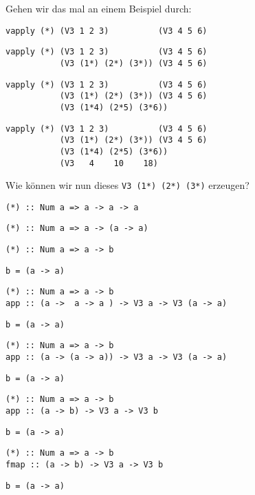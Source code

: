 \documentclass{beamer}
\begin{document}
\begin{frame}[fragile]
Gehen wir das mal an einem Beispiel durch:
\begin{overprint}
\begin{verbatim}
vapply (*) (V3 1 2 3)          (V3 4 5 6)
\end{verbatim}
\begin{verbatim}
vapply (*) (V3 1 2 3)          (V3 4 5 6)
           (V3 (1*) (2*) (3*)) (V3 4 5 6)
\end{verbatim}
\begin{verbatim}
vapply (*) (V3 1 2 3)          (V3 4 5 6)
           (V3 (1*) (2*) (3*)) (V3 4 5 6)
           (V3 (1*4) (2*5) (3*6))
\end{verbatim}
\begin{verbatim}
vapply (*) (V3 1 2 3)          (V3 4 5 6)
           (V3 (1*) (2*) (3*)) (V3 4 5 6)
           (V3 (1*4) (2*5) (3*6))
           (V3   4    10    18)
\end{verbatim}
\end{overprint}
\pause
\pause
\pause
\pause
Wie können wir nun dieses \texttt{V3 (1*) (2*) (3*)} erzeugen?
\pause
\begin{overprint}
\begin{verbatim}
(*) :: Num a => a -> a -> a
\end{verbatim}
\begin{verbatim}
(*) :: Num a => a -> (a -> a)
\end{verbatim}
\begin{verbatim}
(*) :: Num a => a -> b
\end{verbatim}
\texttt{b = (a -> a)}
\begin{verbatim}
(*) :: Num a => a -> b
app :: (a ->  a -> a ) -> V3 a -> V3 (a -> a)
\end{verbatim}
\texttt{b = (a -> a)}
\begin{verbatim}
(*) :: Num a => a -> b
app :: (a -> (a -> a)) -> V3 a -> V3 (a -> a)
\end{verbatim}
\texttt{b = (a -> a)}
\begin{verbatim}
(*) :: Num a => a -> b
app :: (a -> b) -> V3 a -> V3 b
\end{verbatim}
\texttt{b = (a -> a)}
\begin{verbatim}
(*) :: Num a => a -> b
fmap :: (a -> b) -> V3 a -> V3 b
\end{verbatim}
\texttt{b = (a -> a)}
\end{overprint}


\end{frame}
\end{document}
